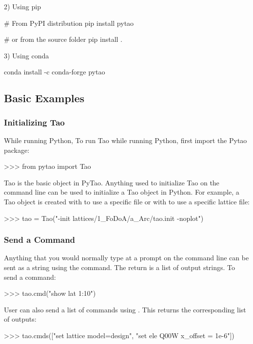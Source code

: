 \documentclass{hitec}     %
\begin{document}
{{{{2) Using pip
\begin{code}
# From PyPI distribution
pip install pytao

# or from the source folder
pip install .

\end{code}

3) Using conda
\begin{code}
conda install -c conda-forge pytao
\end{code}

\subsection{Basic Examples}

\subsubsection{Initializing Tao}
While running Python,
To run Tao while running Python, first import the Pytao package:
\begin{code}
>>> from pytao import Tao
\end{code}

Tao is the basic object in PyTao. Anything used to initialize Tao on the command line can be used to initialize a Tao object in Python. For example, a Tao object is created with  to use a specific  file or with  to use a specific lattice file:
\begin{code}
>>> tao = Tao("-init lattices/1_FoDoA/a_Arc/tao.init -noplot")
\end{code}

\subsubsection{Send a Command}
Anything that you would normally type at a  prompt on the command line can be sent as a string using the  command. The return is a list of output strings. To send a command:
\begin{code}
>>> tao.cmd("show lat 1:10")
\end{code}

User can also send a list of commands using . This returns the corresponding list of outputs:
\begin{code}
>>> tao.cmds(["set lattice model=design", "set ele Q00W x_offset = 1e-6"])
\end{code}

}}}}
\end{document}
